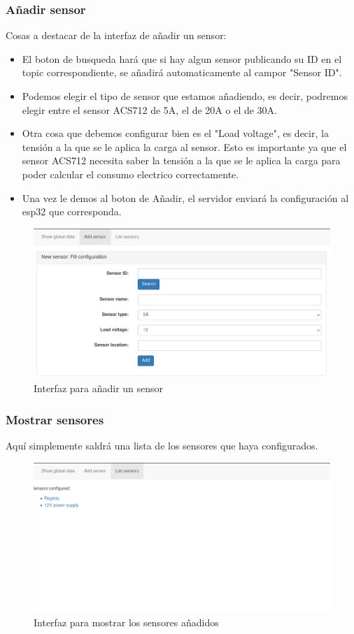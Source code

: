 \begin{titlepage}
\subsubsection{Añadir sensor}
Cosas a destacar de la interfaz de añadir un sensor:
\begin{itemize}
	\item El boton de busqueda hará que si hay algun sensor publicando su ID en el topic correspondiente, se añadirá automaticamente al campor "Sensor ID".
	\item Podemos elegir el tipo de sensor que estamos añadiendo, es decir, podremos elegir entre el sensor ACS712 de 5A, el de 20A o el de 30A.
	\item Otra cosa que debemos configurar bien es el "Load voltage", es decir, la tensión a la que se le aplica la carga al sensor. Esto es importante ya que el sensor ACS712 necesita saber la tensión a la que se le aplica la carga para poder calcular el consumo electrico correctamente.
	\item Una vez le demos al boton de Añadir, el servidor enviará la configuración al esp32 que corresponda.
\end{itemize}
\begin{figure}[h!]
	\centering
	\includegraphics[width=1\textwidth]{imagenes/web_addsensor.png}
	\caption{Interfaz para añadir un sensor}
\end{figure}
\subsubsection{Mostrar sensores}
Aquí simplemente saldrá una lista de los sensores que haya configurados.
\begin{figure}[h!]
	\centering
	\includegraphics[width=1\textwidth]{imagenes/web_listsensors.png}
	\caption{Interfaz para mostrar los sensores añadidos}
\end{figure}

\end{titlepage}
